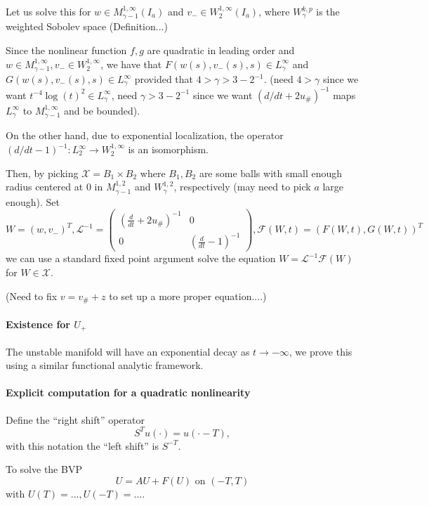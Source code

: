 \documentclass[letterpaper,11pt]{article}
\numberwithin{equation}{section}
\theoremstyle{plain}
\begin{document}
Let us solve this for $w \in M^{1,\infty}_{\gamma-1}(I_a)$ and $v_- \in W^{1, \infty}_{2}(I_a)$, where $W^{k,p}_{\gamma}$ is the weighted Sobolev space (Definition...)

Since the nonlinear function $f,g$ are quadratic in leading order and $w \in M^{1,\infty}_{\gamma-1}, v_- \in W^{1,\infty}_{2}$, we have that $F(w(s),v_-(s),s) \in L^{\infty}_{\gamma}$ 
and $G(w(s),v_-(s),s) \in L^{\infty}_{\gamma}$ provided that $4>\gamma >3-2^{-1}$. (need $4>\gamma$ since we want $t^{-4}\log(t)^2 \in L^{\infty}_{\gamma}$, need $\gamma>3-2^{-1}$ since we want $(d/dt+2u_\#)^{-1}$ maps $L^{\infty}_{\gamma}$ to $M^{1,\infty}_{\gamma-1}$ and be bounded).

On the other hand, due to exponential localization, the operator $(d/dt-1)^{-1}: L_2^{\infty} \to W^{1,\infty}_2$ is an isomorphism. 

Then, by picking $\mathcal{X} = B_1 \times B_2$ where $B_1, B_2$ are some balls with small enough radius centered at $0$ in $M_{\gamma-1}^{1,2}$ and $W_\gamma^{1,2}$, respectively (may need to pick $a$ large enough).
 Set 
 \[
 W= (w,v_-)^T, \mathcal{L}^{-1} = \begin{pmatrix}
 (\frac{d}{dt}+2u_\#)^{-1} & 0\\
0&(\frac{d}{dt}-1)^{-1}
 \end{pmatrix}, \mathcal{F}(W,t) = (F(W,t),G(W,t))^T
 \] we can use a standard fixed point argument solve the equation $W= \mathcal{L}^{-1} \mathcal{F}(W)$ for $W \in \mathcal{X}$.

(Need to fix $v=v_\#+z$ to set up a more proper equation....) 

\paragraph{Existence for $U_+$}
The unstable manifold will have an exponential decay as $t \to -\infty$, we prove this using a similar functional analytic framework.

\pagebreak
\iffalse
\paragraph{Explicit computation for a quadratic nonlinearity}

Define the ``right shift'' operator 
\[
S^Tu(\cdot) = u(\cdot-T),
\]
with this notation the ``left shift'' is $S^{-T}$.

To solve the BVP 
\[
U = AU + F(U) \text{ on }(-T,T)
\]
with $U(T)=... , U(-T)=....$
\end{document}
